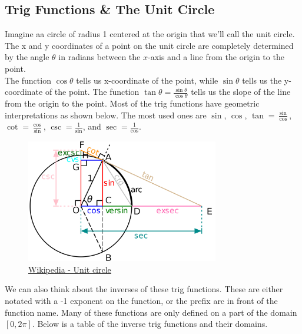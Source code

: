 \subsection{Trig Functions \& The Unit Circle}
\noindent
Imagine aa circle of radius 1 centered at the origin that we'll call the unit circle. The x and y coordinates of a point on the unit circle are completely determined by the angle $\theta$ in radians between the $x$-axis and a line from the origin to the point.\\

\noindent
The function $\cos{\theta}$ tells us x-coordinate of the point, while $\sin{\theta}$ tells us the y-coordinate of the point. The function $\tan{\theta} = \frac{\sin{\theta}}{\cos{\theta}}$ tells us the slope of the line from the origin to the point. Most of the trig functions have geometric interpretations as shown below. The most used ones are $\sin$, $\cos$, $\tan=\frac{\sin}{\cos}$, $\cot = \frac{\cos}{\sin}$, $\csc=\frac{1}{\sin}$, and $\sec=\frac{1}{\cos}$.

\begin{figure}[H]
	\label{unitCircle}
	\centering
	\includegraphics[width = 0.75\textwidth]{../common/algebraPreCalc/unitCircle2.png}
	\caption{\hyperref{https://en.wikipedia.org/wiki/Unit_circle}{}{}{Wikipedia - Unit circle}}
\end{figure}

\noindent
We can also think about the inverses of these trig functions. These are either notated with a -1 exponent on the function, or the prefix arc in front of the function name. Many of these functions are only defined on a part of the domain $\left[0, 2\pi\right]$. Below is a table of the inverse trig functions and their domains.

